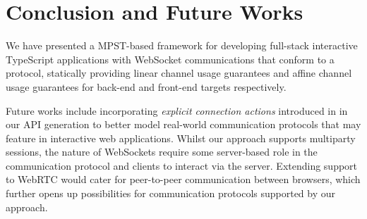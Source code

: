 \section{Conclusion and Future Works}
We have presented a MPST-based framework for developing full-stack interactive
TypeScript applications with WebSocket communications that conform to a
protocol, statically providing linear channel usage guarantees and affine
channel usage guarantees for back-end and front-end targets respectively.

Future works include incorporating \textit{explicit connection actions}
introduced in \cite{ExplicitConnections} in our API generation to better model
real-world communication protocols that may feature in interactive web
applications.
Whilst our approach supports multiparty sessions, the nature of
WebSockets require some server-based role in the communication protocol and
clients to interact via the server.
Extending support to WebRTC \cite{WebRTC} would
cater for peer-to-peer communication between browsers, which further opens up
possibilities for communication protocols supported by our approach.



